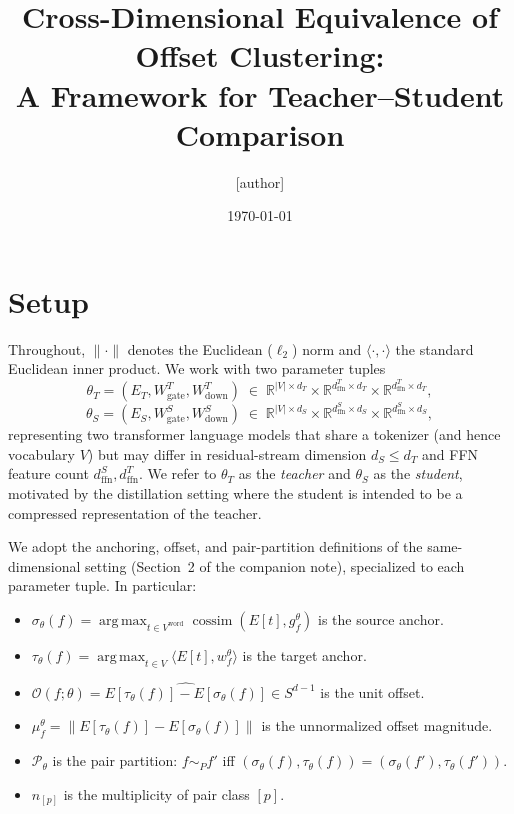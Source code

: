 \documentclass{article}
\title{Cross-Dimensional Equivalence of Offset Clustering: \\
A Framework for Teacher--Student Comparison}
\author{[author]}
\date{\today}
\DeclareMathOperator*{\argmax}{arg\,max}
\DeclareMathOperator{\cossim}{cossim}
\begin{document}
\maketitle

\section{Setup}
\label{sec:setup}

Throughout, $\|\cdot\|$ denotes the Euclidean ($\ell_2$) norm and $\langle \cdot, \cdot \rangle$ the standard Euclidean inner product. We work with two parameter tuples
\[
	\theta_T = (E_T, W_{\mathrm{gate}}^T, W_{\mathrm{down}}^T) \;\in\; \mathbb{R}^{|V| \times d_T} \times \mathbb{R}^{d_{\mathrm{ffn}}^T \times d_T} \times \mathbb{R}^{d_{\mathrm{ffn}}^T \times d_T},
\]
\[
	\theta_S = (E_S, W_{\mathrm{gate}}^S, W_{\mathrm{down}}^S) \;\in\; \mathbb{R}^{|V| \times d_S} \times \mathbb{R}^{d_{\mathrm{ffn}}^S \times d_S} \times \mathbb{R}^{d_{\mathrm{ffn}}^S \times d_S},
\]
representing two transformer language models that share a tokenizer (and hence vocabulary $V$) but may differ in residual-stream dimension $d_S \leq d_T$ and FFN feature count $d_{\mathrm{ffn}}^S, d_{\mathrm{ffn}}^T$. We refer to $\theta_T$ as the \emph{teacher} and $\theta_S$ as the \emph{student}, motivated by the distillation setting where the student is intended to be a compressed representation of the teacher.

We adopt the anchoring, offset, and pair-partition definitions of the same-dimensional setting (Section~2 of the companion note), specialized to each parameter tuple. In particular:
\begin{itemize}
	\item $\sigma_\theta(f) = \argmax_{t \in V^{\mathrm{word}}} \cossim(E[t], g_f^\theta)$ is the source anchor.
	\item $\tau_\theta(f) = \argmax_{t \in V} \langle E[t], w_f^\theta \rangle$ is the target anchor.
	\item $\mathcal{O}(f; \theta) = \widehat{E[\tau_\theta(f)] - E[\sigma_\theta(f)]} \in S^{d-1}$ is the unit offset.
	\item $\mu_f^\theta = \|E[\tau_\theta(f)] - E[\sigma_\theta(f)]\|$ is the unnormalized offset magnitude.
	\item $\mathcal{P}_\theta$ is the pair partition: $f \sim_P f'$ iff $(\sigma_\theta(f), \tau_\theta(f)) = (\sigma_\theta(f'), \tau_\theta(f'))$.
	\item $n_{[p]}$ is the multiplicity of pair class $[p]$.
\end{itemize}
\end{document}
